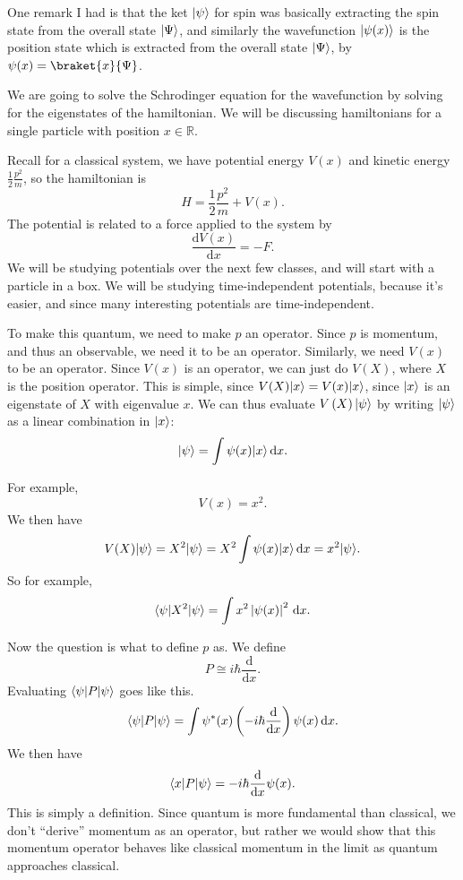 One remark I had is that the ket $\lvert\psi \rangle $ for spin was basically extracting the spin state from the overall state $\lvert\Psi \rangle $, and similarly the wavefunction $\lvert\psi (x)\rangle $ is the position state which is extracted from the overall state $\lvert\Psi \rangle $, by $\psi (x)=\braket{x}{\Psi } $.

We are going to solve the Schrodinger equation for the wavefunction by solving for the eigenstates of the hamiltonian. We will be discussing hamiltonians for a single particle with position $x\in\mathbb{R} $.

Recall for a classical system, we have potential energy $V(x)$ and kinetic energy $\frac{1}{2} \frac{p^2}{m} $, so the hamiltonian is
\[
	H=\frac{1}{2} \frac{p^2}{m} +V(x)
.\]
The potential is related to a force applied to the system by
\[
	\frac{\mathrm{d}V(x)}{\mathrm{d}x} =-F
.\]
We will be studying potentials over the next few classes, and will start with a particle in a box. We will be studying time-independent potentials, because it's easier, and since many interesting potentials are time-independent.

To make this quantum, we need to make $p$ an operator. Since $p$ is momentum, and thus an observable, we need it to be an operator. Similarly, we need $V(x)$ to be an operator. Since $V(x)$ is an operator, we can just do $V(X)$, where $X$ is the position operator. This is simple, since $V(X)\lvert x\rangle =V(x)\lvert x\rangle $, since $\lvert x\rangle$ is an eigenstate of $X$ with eigenvalue $x$. We can thus evaluate $V\left( X \right) \lvert\psi \rangle $ by writing $\lvert\psi \rangle $ as a linear combination in $\lvert x\rangle $:
\[
	\lvert\psi \rangle =\int \psi (x)\lvert x\rangle  \,\mathrm{d} x
.\]

For example,
\[
	V\left(x \right) =x^2
.\]
We then have
\[
	V(X)\lvert\psi \rangle =X^2 \lvert\psi \rangle =X^2 \int \psi (x)\lvert x\rangle  \,\mathrm{d} x=x^2\lvert\psi \rangle 
.\]
So for example,
\[
	\langle\psi \rvert X^2 \lvert\psi \rangle =\int x^2 \left| \psi (x) \right|^2 \,\mathrm{d} x
.\]

Now the question is what to define $p$ as. We define
\[
	P \cong i \hbar \frac{\mathrm{d}}{\mathrm{d}x} 
.\]
Evaluating $\langle\psi \rvert P\lvert\psi \rangle $ goes like this.
\[
	\langle\psi \rvert P \lvert\psi \rangle =\int \psi^*(x)\left( -i\hbar \frac{\mathrm{d}}{\mathrm{d}x}  \right) \psi (x) \,\mathrm{d} x
.\]
We then have
\[
	\langle x\rvert P \lvert\psi \rangle =-i\hbar \frac{\mathrm{d}}{\mathrm{d}x} \psi (x)
.\]
This is simply a definition. Since quantum is more fundamental than classical, we don't ``derive'' momentum as an operator, but rather we would show that this momentum operator behaves like classical momentum in the limit as quantum approaches classical.

